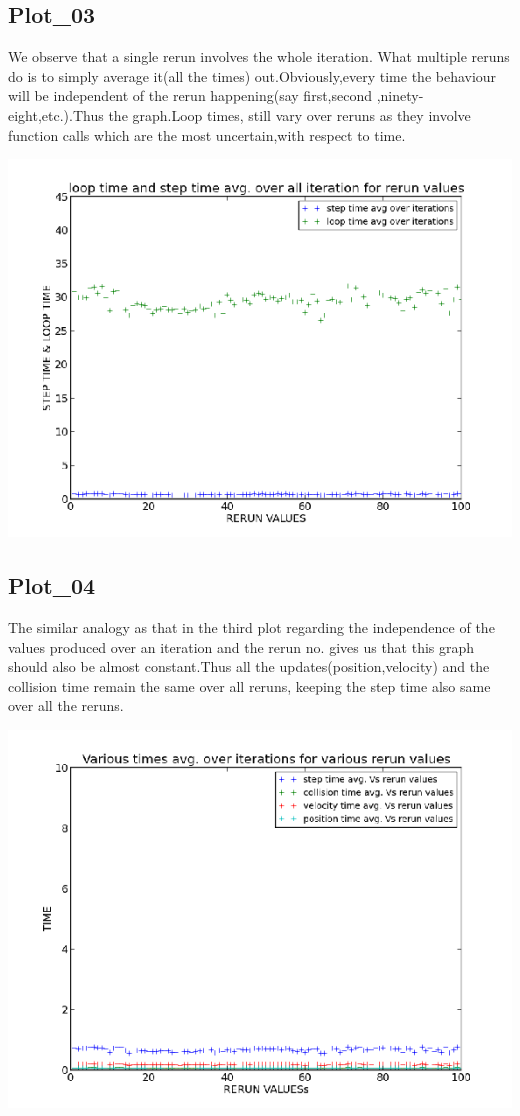 \documentclass[11pt]{article}
\begin{document}
  \subsection{Plot\_03}
We  observe that a single rerun involves the whole iteration. What multiple reruns do is to simply average it(all the times) out.Obviously,every time the behaviour will be independent of the rerun happening(say first,second ,ninety-eight,etc.).Thus the graph.Loop times, still vary over reruns as they involve function calls which are the most uncertain,with respect to time.
 \begin{center}
\includegraphics[scale=0.55]
{images/g18_plot03.png}
\end{center}
	
	
  \subsection{Plot\_04}
The similar analogy as that in the third plot regarding the independence of the values produced over an iteration and the rerun no. gives us that this graph should also be almost constant.Thus all the updates(position,velocity) and the collision time remain the same over all reruns, keeping the step time also same over all the reruns.
 \begin{center}
\includegraphics[scale=0.55]
{images/g18_plot04.png}
\end{center}
	
\end{document}
